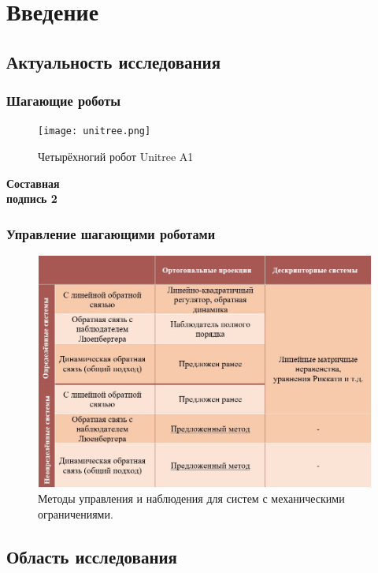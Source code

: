 \section{Введение}

\subsection{Актуальность исследования}

\begin{frame}
	\frametitle{Шагающие роботы}
	    \begin{minipage}[t]{0.47\linewidth}
	    	\begin{figure}
			\texttt{[image: unitree.png]}
			\caption{Четырёхногий робот Unitree A1}
			\end{figure}
	\end{minipage}
	\hfill
	\begin{minipage}[t]{0.47\linewidth}
		\textbf{Составная \\ подпись 2}
		
	\end{minipage}
\end{frame}

\begin{frame}
    \frametitle{Управление шагающими роботами}
	\begin{figure}
	\centering
	\includegraphics[scale=0.6]{images/table.JPG}
	\caption{Методы управления и наблюдения для систем с механическими ограничениями.}
	\label{fig:table}
\end{figure}
\end{frame}

\subsection{Область исследования}

